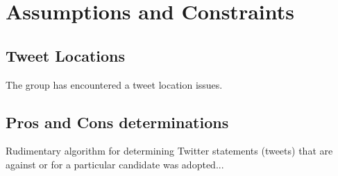 \documentclass[12pt]{article} %
\begin{document}
		
	
	
	
	
	
	
	
	

	

	
	
	
	
	\section{Assumptions and Constraints}
	
	\subsection{Tweet Locations}
	The group has encountered a tweet location issues. \\
	\subsection{Pros and Cons determinations}
	Rudimentary algorithm for determining Twitter statements (tweets) that are against or for a particular candidate was adopted... \\
	
\end{document}
